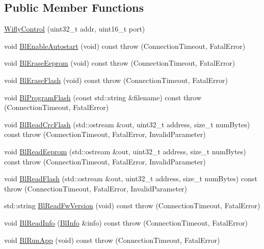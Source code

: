 \subsection*{Public Member Functions}
\begin{DoxyCompactItemize}
\item 
\hyperlink{class_wifly_control_a23f04e8c95cf5ebd5d576c0f6c5fecff}{Wifly\-Control} (uint32\-\_\-t addr, uint16\-\_\-t port)
\item 
void \hyperlink{class_wifly_control_acc372e780a40e0634d1ccf89aaba6b32}{Bl\-Enable\-Autostart} (void) const   throw (\-Connection\-Timeout, Fatal\-Error)
\item 
void \hyperlink{class_wifly_control_a647ca69f7edd312506e56b7473ce3ef4}{Bl\-Erase\-Eeprom} (void) const   throw (\-Connection\-Timeout, Fatal\-Error)
\item 
void \hyperlink{class_wifly_control_a41e9d3ebf658cba44e71970ee7e4653e}{Bl\-Erase\-Flash} (void) const   throw (\-Connection\-Timeout, Fatal\-Error)
\item 
void \hyperlink{class_wifly_control_ace3e7d6e58266b711fa93b974289e6b3}{Bl\-Program\-Flash} (const std\-::string \&filename) const   throw (\-Connection\-Timeout, Fatal\-Error)
\item 
void \hyperlink{class_wifly_control_ab4ae45fd35fc53e7d2e4263fc5651ad6}{Bl\-Read\-Crc\-Flash} (std\-::ostream \&out, uint32\-\_\-t address, size\-\_\-t num\-Bytes) const   throw (\-Connection\-Timeout, Fatal\-Error, Invalid\-Parameter)
\item 
void \hyperlink{class_wifly_control_af9b3c774b26a69d07a0169fb926c0bae}{Bl\-Read\-Eeprom} (std\-::ostream \&out, uint32\-\_\-t address, size\-\_\-t num\-Bytes) const   throw (\-Connection\-Timeout, Fatal\-Error, Invalid\-Parameter)
\item 
void \hyperlink{class_wifly_control_abfa85cd0cb17e0fa65da4c92e32ad0d4}{Bl\-Read\-Flash} (std\-::ostream \&out, uint32\-\_\-t address, size\-\_\-t num\-Bytes) const   throw (\-Connection\-Timeout, Fatal\-Error, Invalid\-Parameter)
\item 
std\-::string \hyperlink{class_wifly_control_a779ef8b2751c2ddf3cd07c869a73797e}{Bl\-Read\-Fw\-Version} (void) const   throw (\-Connection\-Timeout, Fatal\-Error)
\item 
void \hyperlink{class_wifly_control_a26885cabebc9719b1da2d29131517efb}{Bl\-Read\-Info} (\hyperlink{struct_bl_info}{Bl\-Info} \&info) const   throw (\-Connection\-Timeout, Fatal\-Error)
\item 
void \hyperlink{class_wifly_control_a776073bd4991e4331fb946e456d803df}{Bl\-Run\-App} (void) const   throw (\-Connection\-Timeout, Fatal\-Error)

\end{DoxyCompactItemize}
